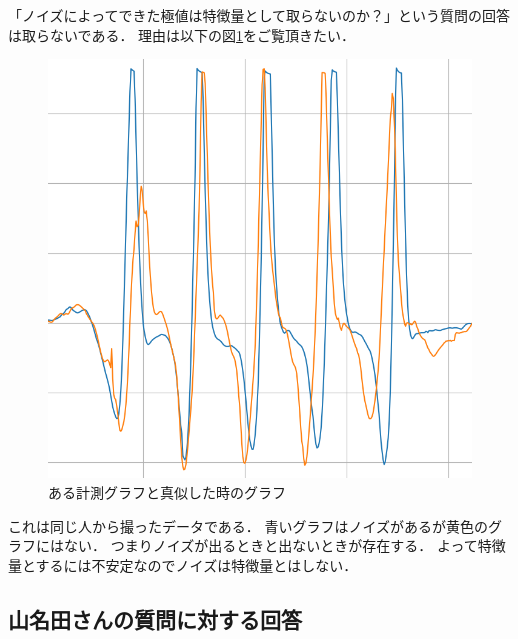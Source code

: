 「ノイズによってできた極値は特徴量として取らないのか？」という質問の回答は取らないである．
理由は以下の図\ref{fig:noiz}をご覧頂きたい．
\begin{figure}[h]
    \vspace{35mm}
    \hspace{1.6cm}
    \includegraphics[scale=0.2]{images_S8/nakajima_takenaka.eps}
    \vspace{-5mm}
    \caption{ある計測グラフと真似した時のグラフ}
    \label{fig:noiz}
\end{figure}
これは同じ人から撮ったデータである．
青いグラフはノイズがあるが黄色のグラフにはない．
つまりノイズが出るときと出ないときが存在する．
よって特徴量とするには不安定なのでノイズは特徴量とはしない．

\subsection{山名田さんの質問に対する回答}

